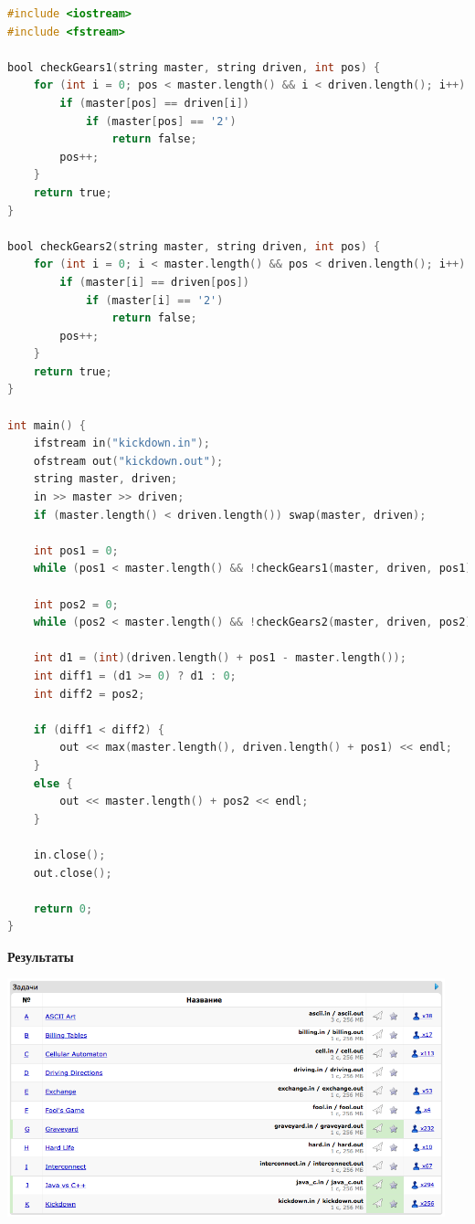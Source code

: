 \documentclass[a4paper,12pt]{article}
\begin{document}
\begin{lstlisting}[language=C]
#include <iostream>
#include <fstream>

bool checkGears1(string master, string driven, int pos) {
    for (int i = 0; pos < master.length() && i < driven.length(); i++) {
        if (master[pos] == driven[i])
            if (master[pos] == '2')
                return false;
        pos++;
    }
    return true;
}

bool checkGears2(string master, string driven, int pos) {
    for (int i = 0; i < master.length() && pos < driven.length(); i++) {
        if (master[i] == driven[pos])
            if (master[i] == '2')
                return false;
        pos++;
    }
    return true;
}

int main() {
	ifstream in("kickdown.in");
    ofstream out("kickdown.out");
    string master, driven;
    in >> master >> driven;
    if (master.length() < driven.length()) swap(master, driven);
    
    int pos1 = 0;
    while (pos1 < master.length() && !checkGears1(master, driven, pos1)) pos1++;
    
    int pos2 = 0;
    while (pos2 < master.length() && !checkGears2(master, driven, pos2)) pos2++;
    
    int d1 = (int)(driven.length() + pos1 - master.length());
    int diff1 = (d1 >= 0) ? d1 : 0;
    int diff2 = pos2;
    
    if (diff1 < diff2) {
        out << max(master.length(), driven.length() + pos1) << endl;
    }
    else {
        out << master.length() + pos2 << endl;
    }
    
    in.close();
    out.close();
    
    return 0;
}
\end{lstlisting}

\textbf{{\large Результаты}} \\
\begin{center}
\includegraphics[width=0.95\textwidth]{CT_S02E09/CT_S02E09_result.png}\\ [1cm]
\end{center}
\end{document}
